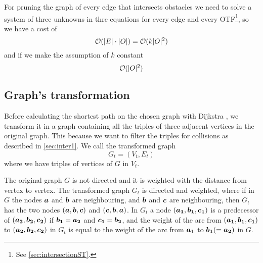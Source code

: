 \documentclass[dissertation.tex]{subfiles}
\begin{document}
For pruning the graph of every edge that intersects obstacles we need
to solve a system of three unknowns in thre equations for every edge
and every \ac{OTF}\footnote{See \cref{sec:intersectionST}.}, so
we have a cost of
\newcommand{\eqCostPruning}{\ensuremath{\bigO(k|\obsSet|^2)}}
\begin{equation}
  \label{eq:costPruning}
  \bigO(|E|\cdot|\obsSet|)=\eqCostPruning
\end{equation}
and if we make the assumption of $k$ constant
\begin{equation*}
  \mathcal{O}(|O|^2)
\end{equation*}

\subsection{Graph's transformation}\label{sec:trigraph}
Before calculating the shortest path on the chosen graph with Dijkstra
\cite{dijkstra}\cite{knuth}, we
transform it in a graph containing all the triples
of three adjacent vertices in the original graph. This because we want
to filter the triples for collisions as described in
\cref{sec:inter1}. We call the transformed graph
$$G_t=(V_t,E_t)$$
where we have triples of vertices of $G$ in $V_t$.

The original graph $G$ is not directed and it is weighted
with the distance from vertex to vertex. The transformed graph $G_t$ is
directed and weighted, where if in $G$ the nodes $\boldsymbol{a}$
and $\boldsymbol{b}$ are
neighbouring, and $\boldsymbol{b}$ and $\boldsymbol{c}$ are neighbouring, then $G_t$
has the two nodes $(\boldsymbol{a},\boldsymbol{b},\boldsymbol{c})$ and $(\boldsymbol{c},\boldsymbol{b},\boldsymbol{a})$. In
$G_t$ a node $(\boldsymbol{a_1},\boldsymbol{b_1},\boldsymbol{c_1})$ is a predecessor of
$(\boldsymbol{a_2},\boldsymbol{b_2},\boldsymbol{c_2})$ if $\boldsymbol{b_1}=\boldsymbol{a_2}$ and $\boldsymbol{c_1}=\boldsymbol{b_2}$, and the weight of the arc
from $(\boldsymbol{a_1},\boldsymbol{b_1},\boldsymbol{c_1})$ to $(\boldsymbol{a_2},\boldsymbol{b_2},\boldsymbol{c_2})$ in $G_t$ is
equal to
the weight of the arc from $\boldsymbol{a_1}$ to $\boldsymbol{b_1}(=\boldsymbol{a_2})$ in $G$.
\end{document}
